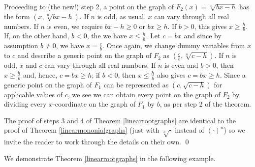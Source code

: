 \documentclass{ximera}
\begin{document}
Proceeding to (the new!) step 2, a point on the graph of $F_{2}(x) = \sqrt[n]{bx-h}$ has the form $(x, \sqrt[n]{bx-h})$.  If $n$ is odd, as usual, $x$ can vary through all real numbers.  If $n$ is even, we require $bx-h \geq 0$ or $bx \geq h$.  If $b>0$, this gives $x \geq \frac{h}{b}$.  If, on the other hand, $b<0$, the we have $x \leq \frac{h}{b}$.   Let  $c = bx$ and since by assumption $b \neq 0$, we have $x = \frac{c}{b}$. Once again, we change dummy variables from $x$ to $c$ and describe a generic point on the graph of $F_{2}$ as $\left( \frac{c}{b}, \sqrt[n]{c - h} \right)$.  If $n$ is odd, $x$ and $c$ can vary through all real numbers.  If $n$ is even and $b>0$, then $x \geq \frac{h}{b}$ and, hence, $c = bx \geq h$;  if $b<0$, then $x \leq \frac{h}{b}$ also gives $c = bx \geq h$.  Since a generic point on the graph of $F_{1}$ can be represented as $(c, \sqrt{c-h})$ for applicable values of $c$, we see we can obtain every point on the graph of $F_{2}$ by dividing every $x$-coordinate on the graph of $F_{1}$ by $b$, as per step 2 of the theorem.

The proof of steps 3 and 4 of Theorem \ref{linearrootgraphs} are identical to the proof of  Theorem \ref{linearmononialgraphs} (just with $\sqrt[n]{\cdot}$ instead of $( \cdot )^n$) so we invite the reader to work through the details on their own.  \qed

We  demonstrate Theorem \ref{linearrootgraphs} in the following example.
\end{document}
